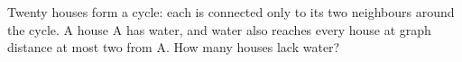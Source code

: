 Twenty houses form a cycle: each is connected only to its two neighbours around the cycle. A house A has water, and water also reaches every house at graph distance at most two from A. How many houses lack water?
